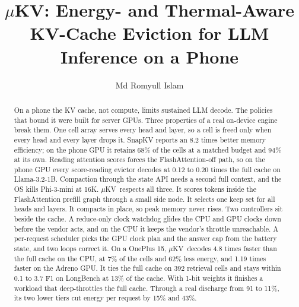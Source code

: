 \documentclass[sigconf, anonymous=false, screen=true]{acmart}
\newcommand{\muKV}{$\mu$KV}
\begin{document}
\title[\muKV: Energy- and Thermal-Aware KV Eviction on a Phone]{\muKV: Energy- and Thermal-Aware KV-Cache Eviction for LLM Inference on a Phone}

\author{Md Romyull Islam}

\begin{abstract}
On a phone the KV cache, not compute, limits sustained LLM decode. The policies that bound it were built for server GPUs. Three properties of a real on-device engine break them. One cell array serves every head and layer, so a cell is freed only when every head and every layer drops it. SnapKV reports an 8.2 times better memory efficiency; on the phone GPU it retains 68\% of the cells at a matched budget and 94\% at its own. Reading attention scores forces the FlashAttention-off path, so on the phone GPU every score-reading evictor decodes at 0.12 to 0.20 times the full cache on Llama-3.2-1B. Compaction through the state API needs a second full context, and the OS kills Phi-3-mini at 16K. \muKV\ respects all three. It scores tokens inside the FlashAttention prefill graph through a small side node. It selects one keep set for all heads and layers. It compacts in place, so peak memory never rises. Two controllers sit beside the cache. A reduce-only clock watchdog glides the CPU and GPU clocks down before the vendor acts, and on the CPU it keeps the vendor's throttle unreachable. A per-request scheduler picks the GPU clock plan and the answer cap from the battery state, and two loops correct it. On a OnePlus 15, \muKV\ decodes 4.8 times faster than the full cache on the CPU, at 7\% of the cells and 62\% less energy, and 1.19 times faster on the Adreno GPU. It ties the full cache on 392 retrieval cells and stays within 0.1 to 3.7 F1 on LongBench at 13\% of the cache. With 1-bit weights it finishes a workload that deep-throttles the full cache. Through a real discharge from 91 to 11\%, its two lower tiers cut energy per request by 15\% and 43\%.
\end{abstract}


\maketitle
\makeatletter{}\makeatother
\end{document}
